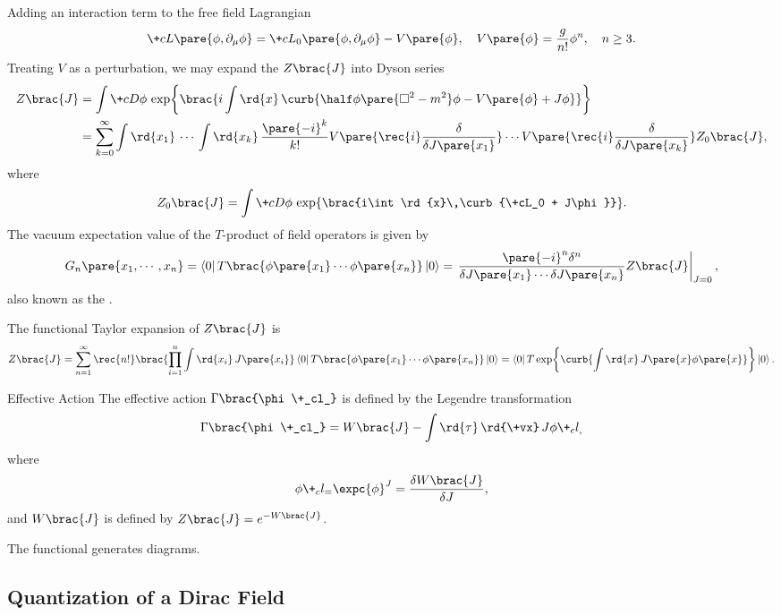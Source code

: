 \documentclass[hidelinks]{article}
\begin{document}
Adding an interaction term to the free field Lagrangian
\[ \+cL\pare{\phi,\partial_\mu \phi} = \+cL_0\pare{\phi,\partial_\mu \phi} - V\pare{\phi},\quad V\pare{\phi} = \frac{g}{n!}\phi^n,\quad n\ge 3. \]
Treating $V$ as a perturbation, we may expand the $Z\brac{J}$ into Dyson series
\begin{align*}
    Z\brac{J} &= \int \+cD \phi \,\exp\brac{i\int \rd{x}\,\curb{\half \phi\pare{\Box^2 - m^2}\phi - V\pare{\phi} + J\phi}} \\
    &= \sum_{k=0}^\infty \int \rd{x_1}\,\cdots \,\int \rd{x_k}\, \frac{\pare{-i}^k}{k!} V\pare{\rec{i}\frac{\delta}{\delta J\pare{x_1}}}\cdots V\pare{\rec{i}\frac{\delta}{\delta J\pare{x_k}}}Z_0\brac{J},
\end{align*}
where
\[ Z_0\brac{J} = \int\+cD\phi\,\exp\brac{i\int \rd{x}\,\curb{\+cL_0 + J\phi}}. \]
The vacuum expectation value of the $T$-product of field operators is given by
\[ G_n\pare{x_1,\cdots,x_n} = \bra{0}T\brac{\phi\pare{x_1}\cdots\phi\pare{x_n}}\ket{0} = \left. \frac{\pare{-i}^n \delta^n}{\delta J\pare{x_1}\cdots \delta J\pare{x_n}}Z\brac{J} \right\vert_{J=0}, \]
also known as the .
\par
The functional Taylor expansion of $Z\brac{J}$ is
\[ Z\brac{J} = \sum_{n=1}^\infty \rec{n!}\brac{\prod_{i=1}^n \int \rd{x_i}\, J\pare{x_i}}\bra{0}T\brac{\phi\pare{x_1}\cdots \phi\pare{x_n}}\ket{0} = \bra{0}T\exp\curb{\int \rd{x}\,J\pare{x}\phi\pare{x}}\ket{0}. \]
\vspace{-\baselineskip}
\begin{termdef}{Effective Action}
    The effective action $\Gamma\brac{\phi\+_cl_}$ is defined by the Legendre transformation
    \[ \Gamma\brac{\phi\+_cl_} = W\brac{J} - \int \rd{\tau}\,\rd{\+vx}\,J\phi\+_cl_, \]
    where
    \[ \phi\+_cl_ = \expc{\phi}^J = \frac{\delta W\brac{J}}{\delta J}, \]
    and $W\brac{J}$ is defined by $Z\brac{J} = e^{-W\brac{J}}$.
\end{termdef}
The functional generates  diagrams.



\subsection{Quantization of a Dirac Field} %
\label{sub:quantization_of_a_dirac_field}
\end{document}
